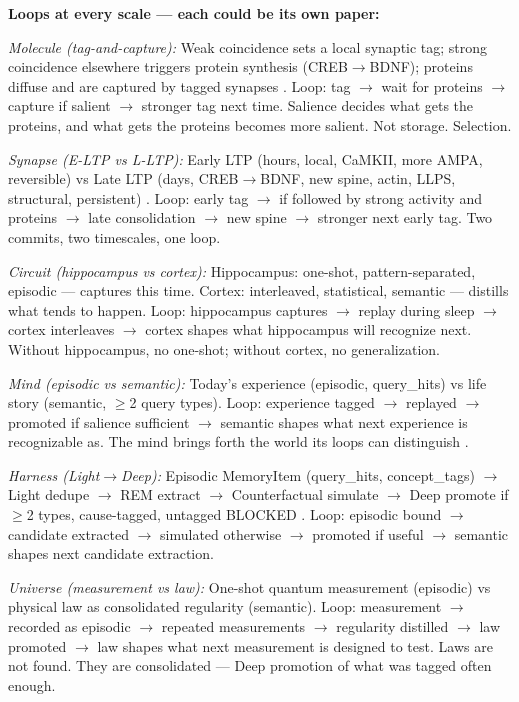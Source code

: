 \documentclass[11pt]{article}
\begin{document}
\textbf{Loops at every scale --- each could be its own paper:}

\textit{Molecule (tag-and-capture):} Weak coincidence sets a local synaptic tag; strong coincidence elsewhere triggers protein synthesis (CREB$\to$\allowbreak{}BDNF); proteins diffuse and are captured by tagged synapses \citep{tononi2014}. Loop: tag $\to$\allowbreak{} wait for proteins $\to$\allowbreak{} capture if salient $\to$\allowbreak{} stronger tag next time. Salience decides what gets the proteins, and what gets the proteins becomes more salient. Not storage. Selection.

\textit{Synapse (E-LTP vs L-LTP):} Early LTP (hours, local, CaMKII, more AMPA, reversible) vs Late LTP (days, CREB$\to$\allowbreak{}BDNF, new spine, actin, LLPS, structural, persistent) \citep{tononi2014}. Loop: early tag $\to$\allowbreak{} if followed by strong activity and proteins $\to$\allowbreak{} late consolidation $\to$\allowbreak{} new spine $\to$\allowbreak{} stronger next early tag. Two commits, two timescales, one loop.

\textit{Circuit (hippocampus vs cortex):} Hippocampus: one-shot, pattern-separated, episodic --- captures this time. Cortex: interleaved, statistical, semantic --- distills what tends to happen. Loop: hippocampus captures $\to$\allowbreak{} replay during sleep $\to$\allowbreak{} cortex interleaves $\to$\allowbreak{} cortex shapes what hippocampus will recognize next. Without hippocampus, no one-shot; without cortex, no generalization.

\textit{Mind (episodic vs semantic):} Today's experience (episodic, query\_hits) vs life story (semantic, $\geq$2 query types). Loop: experience tagged $\to$\allowbreak{} replayed $\to$\allowbreak{} promoted if salience sufficient $\to$\allowbreak{} semantic shapes what next experience is recognizable as. The mind brings forth the world its loops can distinguish \citep{maturana1980}.

\textit{Harness (Light$\to$\allowbreak{}Deep):} Episodic MemoryItem (query\_hits, concept\_tags) $\to$\allowbreak{} Light dedupe $\to$\allowbreak{} REM extract $\to$\allowbreak{} Counterfactual simulate $\to$\allowbreak{} Deep promote if $\geq$2 types, cause-tagged, untagged BLOCKED \citep{tononi2014}. Loop: episodic bound $\to$\allowbreak{} candidate extracted $\to$\allowbreak{} simulated otherwise $\to$\allowbreak{} promoted if useful $\to$\allowbreak{} semantic shapes next candidate extraction.

\textit{Universe (measurement vs law):} One-shot quantum measurement (episodic) vs physical law as consolidated regularity (semantic). Loop: measurement $\to$\allowbreak{} recorded as episodic $\to$\allowbreak{} repeated measurements $\to$\allowbreak{} regularity distilled $\to$\allowbreak{} law promoted $\to$\allowbreak{} law shapes what next measurement is designed to test. Laws are not found. They are consolidated --- Deep promotion of what was tagged often enough.
\end{document}
